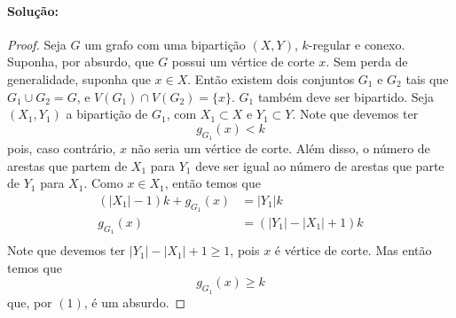 \documentclass[11pt,a4paper,notitlepage]{exam}
\begin{document}
    \paragraph{Solução:}
    \begin{proof}
        Seja $G$ um grafo com uma bipartição $(X,Y)$, $k$-regular e  conexo.\newline
        Suponha, por absurdo, que $G$ possui um vértice de corte $x$.
        Sem perda de generalidade, suponha que $x \in X$.
        Então existem dois conjuntos $G_1$ e $G_2$ tais que $G_1 \cup
        G_2 = G$, e $V(G_1)\cap V(G_2)=\{x\}$. $G_1$ também deve ser
        bipartido. Seja $(X_1, Y_1)$ a bipartição de $G_1$, com $X_1
        \subset
        X$ e $Y_1 \subset Y$.\newline
        Note que devemos ter 
        \begin{equation}
            g_{G_1}(x) < k
        \end{equation}
        pois, caso contrário, $x$
        não seria um vértice de corte. Além disso, o número de arestas
        que partem de $X_1$ para $Y_1$ deve ser igual ao número de
        arestas que parte de $Y_1$ para $X_1$. Como $x\in X_1$, então
        temos que
        \begin{align*}
            (|X_1|-1)k + g_{G_1}(x) &= |Y_1|k\\
            g_{G_1}(x) &= (|Y_1| -|X_1|+1)k\\
        \end{align*}
        Note que devemos ter $|Y_1| - |X_1|+1 \geq 1$, pois $x$ é vértice de
        corte. Mas então temos que
        \begin{equation}
            g_{G_1}(x) \geq k
        \end{equation}
        que, por $(1)$, é um absurdo.
    \end{proof}
\end{document}
